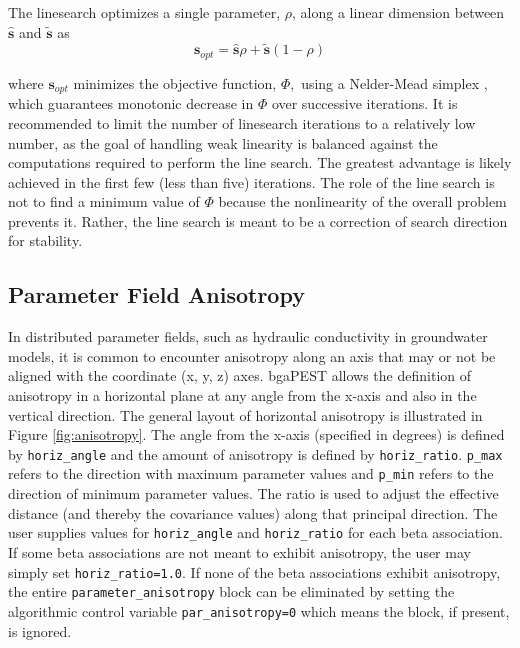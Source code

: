 \documentclass[11pt,oneside,onecolumn]{usgsreport}
\begin{document}
\begin{appendix}
The linesearch optimizes a single parameter, $\rho$, along a linear
dimension between $\mathbf{\hat{s}}$ and $\mathbf{\widetilde{\mathbf{s}}}$
as
\[
\mathbf{s}_{opt}=\mathbf{\mathbf{\hat{s}}}\rho+\mathbf{\widetilde{\mathbf{s}}}\left(1-\rho\right)
\]


where $\mathbf{s}_{opt}$ minimizes the objective function, $\Phi,$
using a Nelder-Mead simplex \citep[see, e.g., ][]{Press1992}, which
guarantees monotonic decrease in $\Phi$ over successive
iterations. It is recommended to limit the number of linesearch iterations
to a relatively low number, as the goal of handling weak linearity
is balanced against the computations required to perform the line
search. The greatest advantage is likely achieved in the first few
(less than five) iterations. The role of the line search is not to
find a minimum value of $\Phi$ because the nonlinearity
of the overall problem prevents it. Rather, the line search is meant
to be a correction of search direction for stability.


\subsection{Parameter Field Anisotropy\label{sub:anisotropy}}

In distributed parameter fields, such as hydraulic conductivity in
groundwater models, it is common to encounter anisotropy along an
axis that may or not be aligned with the coordinate (x, y, z) axes.
bgaPEST allows the definition of anisotropy in a horizontal plane
at any angle from the x-axis and also in the vertical direction. The
general layout of horizontal anisotropy is illustrated in Figure \ref{fig:anisotropy}.
The angle from the x-axis (specified in degrees) is defined by \texttt{horiz\_angle}
and the amount of anisotropy is defined by \texttt{horiz\_ratio}.
\texttt{p\_max} refers to the direction with maximum parameter values
and \texttt{p\_min} refers to the direction of minimum parameter
values. The ratio is used to adjust the effective distance (and thereby
the covariance values) along that principal direction. The user supplies
values for \texttt{horiz\_angle} and \texttt{horiz\_ratio} for each
beta association. If some beta associations are not meant to exhibit
anisotropy, the user may simply set \texttt{horiz\_ratio=1.0}. If
none of the beta associations exhibit anisotropy, the entire \texttt{parameter\_anisotropy}
block can be eliminated by setting the algorithmic control variable
\texttt{par\_anisotropy=0} which means the block, if present, is
ignored.


\end{appendix}
\end{document}
